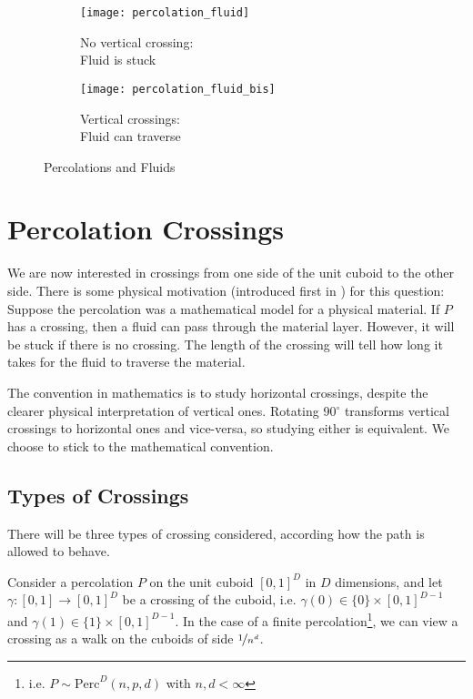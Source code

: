 \begin{wrapfigure}{r}{8.7cm}
	\vspace{-0.75cm}
	\begin{subfigure}{4.3cm}
		\texttt{[image: percolation\_fluid]}
		\centering
		\captionsetup{justification=centering}
		\caption{No vertical crossing: \\Fluid is stuck}
		\label{fig:percolationFluidNoCrossing}
	\end{subfigure}
	\begin{subfigure}{4.2cm}
		\texttt{[image: percolation\_fluid\_bis]}
		\centering
		\captionsetup{justification=centering}
		\caption{Vertical crossings: \\Fluid can traverse}
		\label{fig:percolationFluidCrossing}
	\end{subfigure}
	\centering
	\caption{Percolations and Fluids}
	\label{fig:percolationFluid}
\end{wrapfigure}
\section{Percolation Crossings}
We are now interested in crossings from one side of the unit cuboid to the other side.
There is some physical motivation (introduced first in \cite{broadbent_hammersley_1957}) for this question:
Suppose the percolation was a mathematical model for a physical material.
If $P$ has a crossing, then a fluid can pass through the material layer.
However, it will be stuck if there is no crossing.
The length of the crossing will tell how long it takes for the fluid to traverse the material.

The convention in mathematics is to study horizontal crossings, despite the clearer physical interpretation of vertical ones.
Rotating 90$^{\circ}$ transforms vertical crossings to horizontal ones and vice-versa, so studying either is equivalent.
We choose to stick to the mathematical convention.

\subsection{Types of Crossings}
There will be three types of crossing considered, according how the path is allowed to behave.

Consider a percolation $P$ on the unit cuboid $\left[ 0,1 \right]^D$ in $D$ dimensions, and let $\gamma: \left[ 0,1 \right] \to \left[ 0,1 \right]^D$ be a crossing of the cuboid, i.e. $\gamma(0) \in \{ 0 \} \times \left[ 0,1 \right]^{D-1}$ and $\gamma(1) \in \{ 1 \} \times \left[ 0,1 \right]^{D-1}$.
In the case of a finite percolation\footnote{i.e. $P \sim \text{Perc}^D(n,p,d)$ with $n,d < \infty$}, we can view a crossing as a walk on the cuboids of side $\nicefrac{1}{n^d}$.

